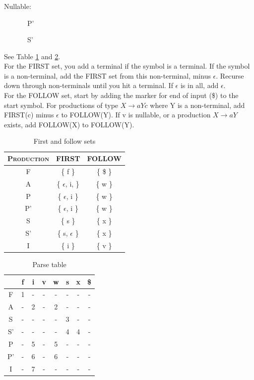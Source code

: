 \subsubsection{}
Nullable:
\begin{description}
 \item[] P'
 \item[] S'
\end{description}
See Table \ref{table:sets} and \ref{table:ptable}.\\
For the FIRST set, you add a terminal if the symbol is a terminal. If the symbol is a non-terminal, add the FIRST set from this non-terminal, minus $\epsilon$. Recurse down through non-terminals until you hit a terminal. If $\epsilon$ is in all, add $\epsilon$.\\
For the FOLLOW set, start by adding the marker for end of input (\$) to the start symbol. For productions of type $X \rightarrow aYc$ where Y is a non-terminal, add FIRST(c) minus $\epsilon$ to FOLLOW(Y). If v is nullable, or a production $X \rightarrow aY$ exists, add FOLLOW(X) to FOLLOW(Y).

\begin{table}
 \centering
  \begin{tabular}{| c | c | c |}
      \hline
      \textsc{Production} & \textsc{FIRST} & \textsc{FOLLOW}     \\ \hline
       F  & \{ f \} & \{ \$ \} \\ \hline
       A  & \{ $\epsilon$, i,  \} & \{ w \} \\ \hline
       P  & \{ $\epsilon$, i \} & \{ w \} \\ \hline
       P' & \{ $\epsilon$, i \} & \{ w \} \\ \hline
       S  & \{ s \} & \{ x \} \\ \hline
       S' & \{ s, $\epsilon$ \} & \{ x \} \\ \hline
       I  & \{ i \} & \{ v \} \\ \hline
  \end{tabular}
 \caption{First and follow sets}
  \label{table:sets}
\end{table}

\begin{table}
 \centering
  \begin{tabular}{| c | c | c | c | c | c | c | c |}
      \hline
                   & f & i & v & w & s & x & \$ \\ \hline
       \textsc{F}  & 1 & - & - & - & - & - & -  \\ \hline
       \textsc{A}  & - & 2 & - & 2 & - & - & -  \\ \hline 
       \textsc{S}  & - & - & - & - & 3 & - & -  \\ \hline
       \textsc{S'} & - & - & - & - & 4 & 4 & -  \\ \hline
       \textsc{P}  & - & 5 & - & 5 & - & - & -  \\ \hline 
       \textsc{P'} & - & 6 & - & 6 & - & - & -  \\ \hline
       \textsc{I}  & - & 7 & - & - & - & - & -  \\ \hline
  \end{tabular}
 \caption{Parse table}
  \label{table:ptable}
\end{table}

